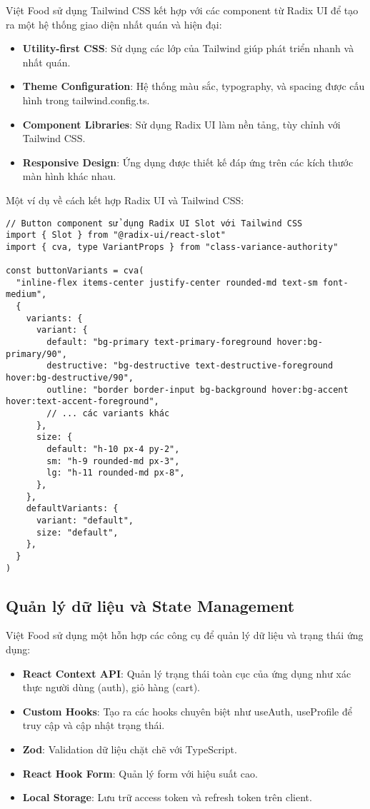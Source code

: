 Việt Food sử dụng Tailwind CSS kết hợp với các component từ Radix UI để tạo ra một hệ thống giao diện nhất quán và hiện đại:

\begin{itemize}
    \item \textbf{Utility-first CSS}: Sử dụng các lớp của Tailwind giúp phát triển nhanh và nhất quán.
    \item \textbf{Theme Configuration}: Hệ thống màu sắc, typography, và spacing được cấu hình trong tailwind.config.ts.
    \item \textbf{Component Libraries}: Sử dụng Radix UI làm nền tảng, tùy chỉnh với Tailwind CSS.
    \item \textbf{Responsive Design}: Ứng dụng được thiết kế đáp ứng trên các kích thước màn hình khác nhau.
\end{itemize}

Một ví dụ về cách kết hợp Radix UI và Tailwind CSS:

\begin{verbatim}
// Button component sử dụng Radix UI Slot với Tailwind CSS
import { Slot } from "@radix-ui/react-slot"
import { cva, type VariantProps } from "class-variance-authority"

const buttonVariants = cva(
  "inline-flex items-center justify-center rounded-md text-sm font-medium",
  {
    variants: {
      variant: {
        default: "bg-primary text-primary-foreground hover:bg-primary/90",
        destructive: "bg-destructive text-destructive-foreground hover:bg-destructive/90",
        outline: "border border-input bg-background hover:bg-accent hover:text-accent-foreground",
        // ... các variants khác
      },
      size: {
        default: "h-10 px-4 py-2",
        sm: "h-9 rounded-md px-3",
        lg: "h-11 rounded-md px-8",
      },
    },
    defaultVariants: {
      variant: "default",
      size: "default",
    },
  }
)
\end{verbatim}

\subsection{Quản lý dữ liệu và State Management}

Việt Food sử dụng một hỗn hợp các công cụ để quản lý dữ liệu và trạng thái ứng dụng:

\begin{itemize}
    \item \textbf{React Context API}: Quản lý trạng thái toàn cục của ứng dụng như xác thực người dùng (auth), giỏ hàng (cart).
    \item \textbf{Custom Hooks}: Tạo ra các hooks chuyên biệt như useAuth, useProfile để truy cập và cập nhật trạng thái.
    \item \textbf{Zod}: Validation dữ liệu chặt chẽ với TypeScript.
    \item \textbf{React Hook Form}: Quản lý form với hiệu suất cao.
    \item \textbf{Local Storage}: Lưu trữ access token và refresh token trên client.
\end{itemize}

